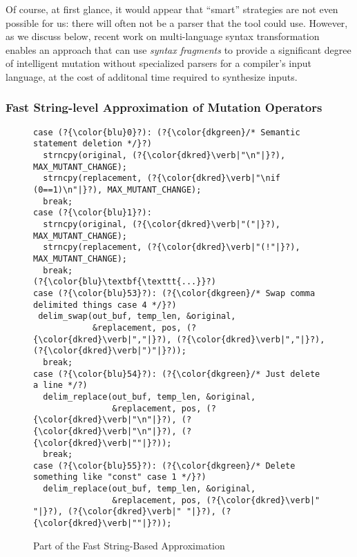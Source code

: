 Of course, at first
glance, it would appear that  ``smart'' strategies are not even
possible for us: there will often not be a parser that the
tool could use.  However, as we discuss below, recent work on
multi-language syntax transformation~\cite{combypaper} enables an approach that can use
\emph{syntax fragments} to provide a significant degree of intelligent
mutation without specialized parsers for a compiler's input language,
at the cost of additonal time required to synthesize inputs.

\begin{sloppypar}
\subsubsection{Fast String-level Approximation of Mutation Operators}
\label{strat-fast-string-level}

\begin{figure}[h!]
\begin{lstlisting}[basicstyle=\scriptsize\ttfamily,numbers=none,xleftmargin=0.7em,xrightmargin=.7em]
case (?{\color{blu}0}?): (?{\color{dkgreen}/* Semantic statement deletion */}?)
  strncpy(original, (?{\color{dkred}\verb|"\n"|}?), MAX_MUTANT_CHANGE);
  strncpy(replacement, (?{\color{dkred}\verb|"\nif (0==1)\n"|}?), MAX_MUTANT_CHANGE);
  break;
case (?{\color{blu}1}?):
  strncpy(original, (?{\color{dkred}\verb|"("|}?), MAX_MUTANT_CHANGE);
  strncpy(replacement, (?{\color{dkred}\verb|"(!"|}?), MAX_MUTANT_CHANGE);
  break;
(?{\color{blu}\textbf{\texttt{...}}?)
case (?{\color{blu}53}?): (?{\color{dkgreen}/* Swap comma delimited things case 4 */}?)
 delim_swap(out_buf, temp_len, &original, 
            &replacement, pos, (?{\color{dkred}\verb|","|}?), (?{\color{dkred}\verb|","|}?), (?{\color{dkred}\verb|")"|}?));
  break;
case (?{\color{blu}54}?): (?{\color{dkgreen}/* Just delete a line */?)
  delim_replace(out_buf, temp_len, &original, 
                &replacement, pos, (?{\color{dkred}\verb|"\n"|}?), (?{\color{dkred}\verb|"\n"|}?), (?{\color{dkred}\verb|""|}?));
  break;
case (?{\color{blu}55}?): (?{\color{dkgreen}/* Delete something like "const" case 1 */}?)
  delim_replace(out_buf, temp_len, &original, 
                &replacement, pos, (?{\color{dkred}\verb|" "|}?), (?{\color{dkred}\verb|" "|}?), (?{\color{dkred}\verb|""|}?));
\end{lstlisting}
\caption{Part of the Fast String-Based Approximation}
\label{fig:foperators}
\end{figure}


\end{sloppypar}
